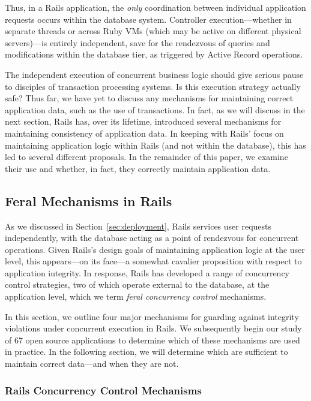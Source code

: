 Thus, in a Rails application, the \textit{only} coordination between individual application requests occurs within the database system. Controller execution---whether in separate threads or across Ruby VMs (which may be active on different physical servers)---is entirely independent, save for the rendezvous of queries and modifications within the database tier, as triggered by Active Record operations.

The independent execution of concurrent business logic should give
serious pause to disciples of transaction processing systems. Is this
execution strategy actually safe? Thus far, we have yet to discuss any
mechanisms for maintaining correct application data, such as the use
of transactions. In fact, as we will discuss in the next section,
Rails has, over its lifetime, introduced several mechanisms for
maintaining consistency of application data. In keeping with Rails'
focus on maintaining application logic within Rails (and not within the
database), this has led to several different proposals. In the
remainder of this paper, we examine their use and whether, in fact,
they correctly maintain application data.




\subsection{Feral Mechanisms in Rails}
\label{sec:rails-cc}

As we discussed in Section~\ref{sec:deployment}, Rails services user
requests independently, with the database acting as a point
of rendezvous for concurrent operations. Given Rails's design goals of
maintaining application logic at the user level, this appears---on its
face---a somewhat cavalier proposition with respect to application
integrity. In response, Rails has developed a range of concurrency
control strategies, two of which operate external to the database, at
the application level, which we term \textit{feral concurrency
  control} mechanisms.

In this section, we outline four major mechanisms for guarding against
integrity violations under concurrent execution in Rails. We
subsequently begin our study of 67 open source applications to
determine which of these mechanisms are used in practice. In the following
section, we will determine which are sufficient to maintain
correct data---and when they are not.

\subsubsection{Rails Concurrency Control Mechanisms}


